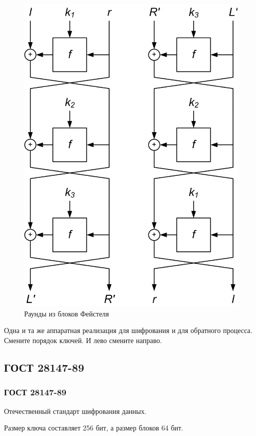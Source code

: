 \begin{frame}
\begin{figure}
\begin{center}
{                \includegraphics[width=.74\textwidth]{pict/feistelhrounds} 
                \caption{Раунды из блоков Фейстеля}\label{pict:feistelhrounds}
            }
        \end{center}
    \end{figure}
\end{frame}

Одна и та же аппаратная реализация для шифрования и для обратного процесса. Смените порядок ключей. И лево смените направо.


\subsection{ГОСТ 28147-89}


\begin{frame}
    \frametitle{ГОСТ 28147-89}
    
    Отечественный стандарт шифрования данных.
    
    Размер ключа составляет 256 бит, а размер блоков 64 бит.
\end{frame}


